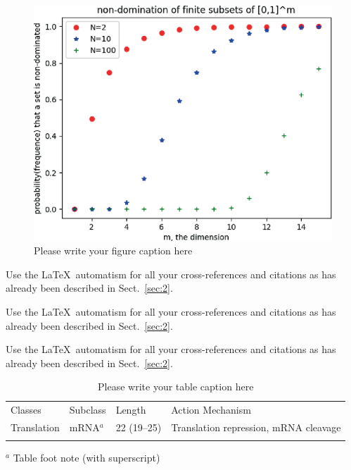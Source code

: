 \begin{figure}[t]
    \sidecaption[t]
    \includegraphics{figure}
    \caption{Please write your figure caption here}
    \label{fig:2}       %
\end{figure}

 Use the \LaTeX\ automatism for all your cross-references and citations as has already been described in Sect.~\ref{sec:2}.

 Use the \LaTeX\ automatism for all your cross-refer\-ences and citations as has already been described in Sect.~\ref{sec:2}.

 Use the \LaTeX\ automatism for all your cross-refer\-ences and citations as has already been described in Sect.~\ref{sec:2}.
%
%
\begin{table}[!t]
    \caption{Please write your table caption here}
    \label{tab:1}       %
    \begin{tabular}{p{2cm}p{2.4cm}p{2cm}p{4.9cm}}
        \hline\noalign{\smallskip}
        Classes     & Subclass & Length      & Action Mechanism                      \\
        \noalign{\smallskip}\svhline\noalign{\smallskip}
        Translation & mRNA$^a$ & 22 (19--25) & Translation repression, mRNA cleavage \\
        \noalign{\smallskip}\hline\noalign{\smallskip}
    \end{tabular}
    $^a$ Table foot note (with superscript)
\end{table}
%
